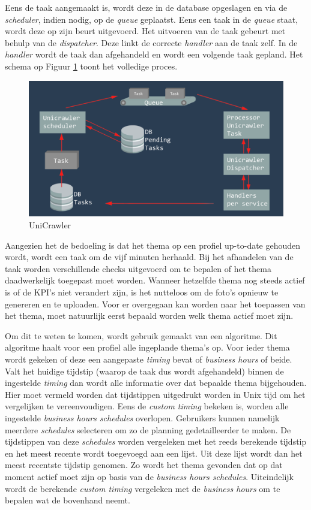 Eens de taak aangemaakt is, wordt deze in de database opgeslagen en via de \textit{scheduler}, indien nodig, op de \textit{queue} geplaatst. Eens een taak in de \textit{queue} staat, wordt deze op zijn beurt uitgevoerd. Het uitvoeren van de taak gebeurt met behulp van de \textit{dispatcher}. Deze linkt de correcte \textit{handler} aan de taak zelf. In de \textit{handler} wordt de taak dan afgehandeld en wordt een volgende taak gepland. Het schema op Figuur \ref{fig:UniCrawler} toont het volledige proces. 

\begin{figure}[H]
	\centering
	\includegraphics[width=1\textwidth]{Figuren/UniCrawler.png}
	\caption{UniCrawler}
	\label{fig:UniCrawler}
\end{figure}

Aangezien het de bedoeling is dat het thema op een profiel up-to-date gehouden wordt, wordt een taak om de vijf minuten herhaald. %
Bij het afhandelen van de taak worden verschillende checks uitgevoerd om te bepalen of het thema daadwerkelijk toegepast moet worden. Wanneer hetzelfde thema nog steeds actief is of de KPI's niet verandert zijn, is het nutteloos om de foto's opnieuw te genereren en te uploaden. Voor er overgegaan kan worden naar het toepassen van het thema, moet natuurlijk eerst bepaald worden welk thema actief moet zijn. 

Om dit te weten te komen, wordt gebruik gemaakt van een algoritme. Dit algoritme haalt voor een profiel alle ingeplande thema's op. Voor ieder thema wordt gekeken of deze een aangepaste \textit{timing} bevat of \textit{business hours} of beide. Valt het huidige tijdstip (waarop de taak dus wordt afgehandeld) binnen de ingestelde \textit{timing} dan wordt alle informatie over dat bepaalde thema bijgehouden. Hier moet vermeld worden dat tijdstippen uitgedrukt worden in Unix tijd om het vergelijken te vereenvoudigen. Eens de \textit{custom timing} bekeken is, worden alle ingestelde \textit{business hours schedules} overlopen. Gebruikers kunnen namelijk meerdere \textit{schedules} selecteren om zo de planning gedetailleerder te maken. De tijdstippen van deze \textit{schedules} worden vergeleken met het reeds berekende tijdstip en het meest recente wordt toegevoegd aan een lijst. Uit deze lijst wordt dan het meest recentste tijdstip genomen. Zo wordt het thema gevonden dat op dat moment actief moet zijn op basis van de \textit{business hours schedules}. Uiteindelijk wordt de berekende \textit{custom timing} vergeleken met de \textit{business hours} om te bepalen wat de bovenhand neemt. 


